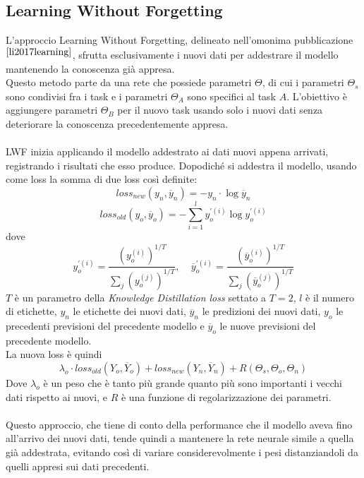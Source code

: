 \subsection{Learning Without Forgetting}
L'approccio Learning Without Forgetting, delineato nell'omonima pubblicazione$^{\cite{li2017learning}}$, sfrutta esclusivamente i nuovi dati per addestrare il modello mantenendo la conoscenza già appresa.\\
Questo metodo parte da una rete che possiede parametri $\Theta$, di cui i parametri $\Theta_s$ sono condivisi fra i task e i parametri $\Theta_A$ sono specifici al task $A$. L'obiettivo è aggiungere parametri $\Theta_B$ per il nuovo task usando solo i nuovi dati senza deteriorare la conoscenza precedentemente appresa.\\\\
LWF inizia applicando il modello addestrato ai dati nuovi appena arrivati, registrando i risultati che esso produce. Dopodiché si addestra il modello, usando come loss la somma di due loss così definite:
\begin{equation}\label{eq:lwf_lossnew}
    loss_{new}(y_n, \overline{y}_n) = -y_n\cdot\log\overline{y}_n
\end{equation}
\begin{equation}\label{eq:lwf_lossnew}
    loss_{old}(y_o, \overline{y}_o) = -\sum_{i=1}^l y_o^{'(i)}\log y_o^{'(i)}
\end{equation}
dove
\begin{equation}\label{eq:lwf_lossnew}
    y_o^{'(i)} = \frac{\left(y_o^{(i)}\right)^{1/T}}{\sum_j \left(y_o^{(j)}\right)^{1/T}},\:\:\:\:\:
    \overline{y}_o^{'(i)} = \frac{\left(\overline{y}_o^{(i)}\right)^{1/T}}{\sum_j \left(\overline{y}_o^{(j)}\right)^{1/T}}
\end{equation}
$T$ è un parametro della \textit{Knowledge Distillation loss} settato a $T = 2$, $l$ è il numero di etichette, $y_n$ le etichette dei nuovi dati, $\overline{y}_n$ le predizioni dei nuovi dati, $y_o$ le precedenti previsioni del precedente modello e $\overline{y}_o$ le nuove previsioni del precedente modello.\\
La nuova loss è quindi
\begin{equation}\label{eq:lwf_loss}
    \lambda_o\cdot loss_{old}(Y_o, \overline{Y}_o) + loss_{new}(Y_n, \overline{Y}_n) + R(\Theta_s, \Theta_o, \Theta_n)
\end{equation}
Dove $\lambda_o$ è un peso che è tanto più grande quanto più sono importanti i vecchi dati rispetto ai nuovi, e $R$ è una funzione di regolarizzazione dei parametri.\\\\
Questo approccio, che tiene di conto della performance che il modello aveva fino all'arrivo dei nuovi dati, tende quindi a mantenere la rete neurale simile a quella già addestrata, evitando così di variare considerevolmente i pesi distanziandoli da quelli appresi sui dati precedenti.

